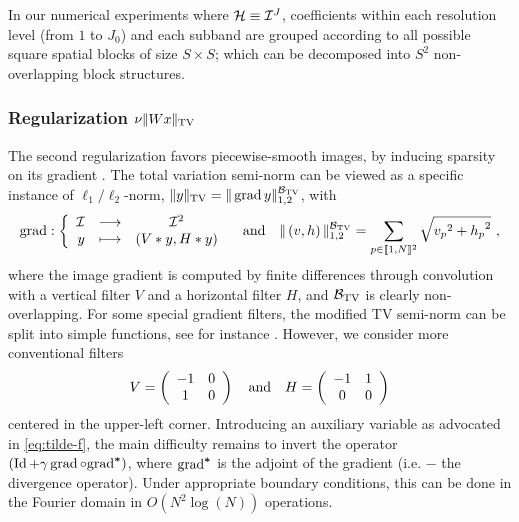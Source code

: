 In our numerical experiments where $\mathcal{H} \equiv \mathcal{I}^J$, coefficients within each resolution level (from $1$ to $J_0$) and each subband are grouped according to all possible square spatial blocks of size $S \times S$; which can be decomposed into $S^2$ non-overlapping block structures.

	\subsubsection{Regularization $\nu |\kern-1pt| W x |\kern-1pt|_{\mathrm{TV}}$}
	\label{sec:tv-reg}

The second regularization favors piecewise-smooth images, by inducing sparsity on its gradient \cite{ROF92}. The total variation semi-norm can be viewed as a specific instance of $\ell_1/\ell_2$-norm, $|\kern-1pt| y |\kern-1pt|_{\mathrm{TV}} = |\kern-1pt| \operatorname{grad} y |\kern-1pt|_{1,2}^{\mathcal{B}_{\mathrm{TV}}}$, with
%
\begin{equation*}
 \gradient : \left\{ \begin{array}{rcc}
          \RNN & \longrightarrow &  \RG\\
          y    & \longmapsto & (V \ast y, H \ast y)
          \end{array} \right.%
\qobjq{and} \normbktv{\pa{v,h}} = \sum_{p \in \bbket{1,N}^2} \sqrt{{v_p}^2 + {h_p}^2} ~,
\end{equation*}
% 
where the image gradient is computed by finite differences through convolution with a vertical filter $V$ and a horizontal filter $H$, and $\mathcal{B}_{\mathrm{TV}}$ is clearly non-overlapping. For some special gradient filters, the modified TV semi-norm can be split into simple functions, see for instance \cite{CombettesPesquet08,Pustelnik11}. However, we consider more conventional filters
%
\begin{equation*}
V =\left( \begin{array}{cc}  -1 & 0 \\ 1 & 0 \end{array} \right)%
\qobjq{and}%
H =\left( \begin{array}{cc}  -1 & 1 \\ 0 & 0 \end{array} \right)
\end{equation*}
% 
centered in the upper-left corner. Introducing an auxiliary variable as ad\-vo\-ca\-ted in \eqref{eq:tilde-f}, the main difficulty remains to invert the operator $\left( \operatorname{Id} + \gamma \operatorname{grad} \circ {\operatorname{grad}}^{\boldsymbol*} \right)$, where ${\operatorname{grad}}^{\boldsymbol*}$ is the adjoint of the gradient (i.e. $-$ the divergence operator). Under appropriate boundary conditions, this can be done in the Fourier domain in $O(N^2 \log(N))$ operations.

